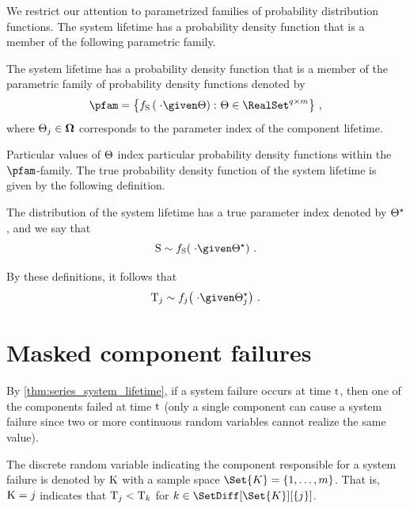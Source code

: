 \documentclass[../main.tex]{subfiles}
\begin{document}
We restrict our attention to parametrized families of probability distribution functions. The system lifetime has a probability density function that is a member of the following parametric family.
\begin{definition}
    \label{def:sysparametric}
    The system lifetime has a probability density function that is a member of 
    the parametric family of probability density functions denoted by
    \begin{equation}
    \label{eq:paramsys}
    \pfam = \left \{ \spdf\left(\; \cdot \given \sysparam\right) \colon 
    \sysparam \in \RealSet^{q \times m} \right \}\,,
    \end{equation}
    where $\Theta_j \in \boldsymbol\Omega$ corresponds to the parameter 
    index of the \jth component lifetime.
\end{definition}
Particular values of $\Theta$ index particular probability density functions 
within the $\pfam$-family. The true probability density function of the system 
lifetime is given by the following definition.
\begin{definition}
    \label{def:true_param}
    The distribution of the system lifetime has a true parameter index denoted 
    by ${\Theta}^{\star}$, and we say that
    \begin{equation}
        \sv \sim \spdf\!\left(\;\cdot \given \tparam\sysparam\right)\,.
    \end{equation}
\end{definition}
By these definitions, it follows that
\begin{equation}
    \cv_j \sim \pdf_j\!\left(\; \cdot \given \tparam\sysparam_j\right)\,.
\end{equation}

\section{Masked component failures}
By \cref{thm:series_system_lifetime}, if a system failure occurs at time $\mathrm{t}$, then one of the components failed at time $\mathrm{t}$ (only a single component can cause a system failure since two or more continuous random variables cannot realize the same value).
\begin{definition}
	\label{def:comp_cause}
	The discrete random variable indicating the component responsible for a system failure is denoted by $\mathrm{K}$ with a sample space $\Set{K} = \{1,\ldots,m\}$. That is, $\mathrm{K} = j$ indicates that $\mathrm{T}_j < \mathrm{T}_k$ for $k \in \SetDiff[\Set{K}][\{ j \}]$.
\end{definition}
\end{document}
